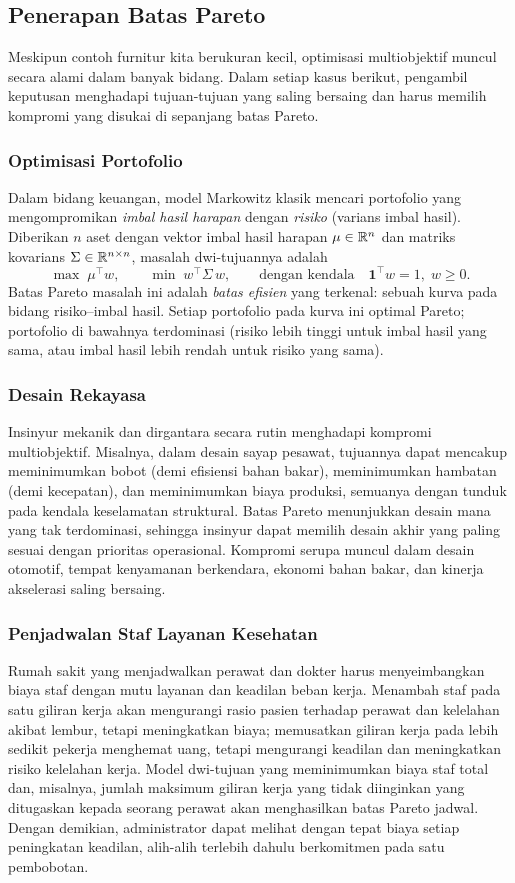 \subsection{Penerapan Batas Pareto}

Meskipun contoh furnitur kita berukuran kecil, optimisasi multiobjektif muncul secara alami dalam banyak bidang. Dalam setiap kasus berikut, pengambil keputusan menghadapi tujuan-tujuan yang saling bersaing dan harus memilih kompromi yang disukai di sepanjang batas Pareto.

\subsubsection{Optimisasi Portofolio}
Dalam bidang keuangan, model Markowitz klasik mencari portofolio yang mengompromikan \emph{imbal hasil harapan} dengan \emph{risiko} (varians imbal hasil). Diberikan $n$ aset dengan vektor imbal hasil harapan $\mu \in {\mathbb{R}}^n$ dan matriks kovarians $\Sigma \in {\mathbb{R}}^{n \times n}$, masalah dwi-tujuannya adalah
\[
\max \; \mu^\top w, \qquad \min \; w^\top \Sigma\, w, \qquad \text{dengan kendala} \quad \mathbf{1}^\top w = 1, \; w \geq 0.
\]
Batas Pareto masalah ini adalah \emph{batas efisien} yang terkenal: sebuah kurva pada bidang risiko--imbal hasil. Setiap portofolio pada kurva ini optimal Pareto; portofolio di bawahnya terdominasi (risiko lebih tinggi untuk imbal hasil yang sama, atau imbal hasil lebih rendah untuk risiko yang sama).

\subsubsection{Desain Rekayasa}
Insinyur mekanik dan dirgantara secara rutin menghadapi kompromi multiobjektif. Misalnya, dalam desain sayap pesawat, tujuannya dapat mencakup meminimumkan bobot (demi efisiensi bahan bakar), meminimumkan hambatan (demi kecepatan), dan meminimumkan biaya produksi, semuanya dengan tunduk pada kendala keselamatan struktural. Batas Pareto menunjukkan desain mana yang tak terdominasi, sehingga insinyur dapat memilih desain akhir yang paling sesuai dengan prioritas operasional. Kompromi serupa muncul dalam desain otomotif, tempat kenyamanan berkendara, ekonomi bahan bakar, dan kinerja akselerasi saling bersaing.

\subsubsection{Penjadwalan Staf Layanan Kesehatan}
Rumah sakit yang menjadwalkan perawat dan dokter harus menyeimbangkan biaya staf dengan mutu layanan dan keadilan beban kerja. Menambah staf pada satu giliran kerja akan mengurangi rasio pasien terhadap perawat dan kelelahan akibat lembur, tetapi meningkatkan biaya; memusatkan giliran kerja pada lebih sedikit pekerja menghemat uang, tetapi mengurangi keadilan dan meningkatkan risiko kelelahan kerja. Model dwi-tujuan yang meminimumkan biaya staf total dan, misalnya, jumlah maksimum giliran kerja yang tidak diinginkan yang ditugaskan kepada seorang perawat akan menghasilkan batas Pareto jadwal. Dengan demikian, administrator dapat melihat dengan tepat biaya setiap peningkatan keadilan, alih-alih terlebih dahulu berkomitmen pada satu pembobotan.

